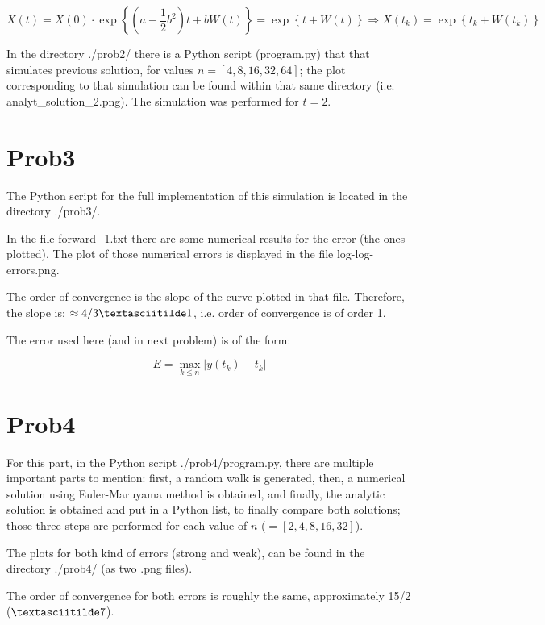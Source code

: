\documentclass[paper=a4, fontsize=11pt]{scrartcl} %
\numberwithin{equation}{section} %
\numberwithin{figure}{section} %
\numberwithin{table}{section} %
\begin{document}
$$ X(t) = X(0) \cdot \exp \left\{ \left(a - \frac{1}{2}b^{2}\right)t+b W(t) \right\} = \exp \left\{ t+W(t) \right\} \Rightarrow  X(t_{k}) = \exp \left\{ t_{k}+W(t_{k}) \right\} $$

In the directory ./prob2/ there is a Python script (program.py) that that simulates previous solution, for values $n = [4, 8, 16, 32, 64]$; the plot corresponding to that simulation can be found within that same directory (i.e. analyt\_solution\_2.png). The simulation was performed for $t = 2$.

\section{Prob3}

The Python script for the full implementation of this simulation is located in the directory ./prob3/.

In the file forward\_1.txt there are some numerical results for the error (the ones plotted). The plot of those numerical errors is displayed in the file log-log-errors.png.

The order of convergence is the slope of the curve plotted in that file. Therefore, the slope is: $\approx 4/3 \textasciitilde 1$, i.e. order of convergence is of order 1.

The error used here (and in next problem) is of the form:

$$ E = \max_{k \le n} | y(t_{k}) - t_{k} | $$


\section{Prob4}

For this part, in the Python script ./prob4/program.py, there are multiple important parts to mention: first, a random walk is generated, then, a numerical solution using Euler-Maruyama method is obtained, and finally, the analytic solution is obtained and put in a Python list, to finally compare both solutions; those three steps are performed for each value of $n$ ($ = [2, 4, 8, 16, 32]$).

The plots for both kind of errors (strong and weak), can be found in the directory ./prob4/ (as two .png files).

The order of convergence for both errors is roughly the same, approximately 15/2 ($\textasciitilde 7 $).
\end{document}
